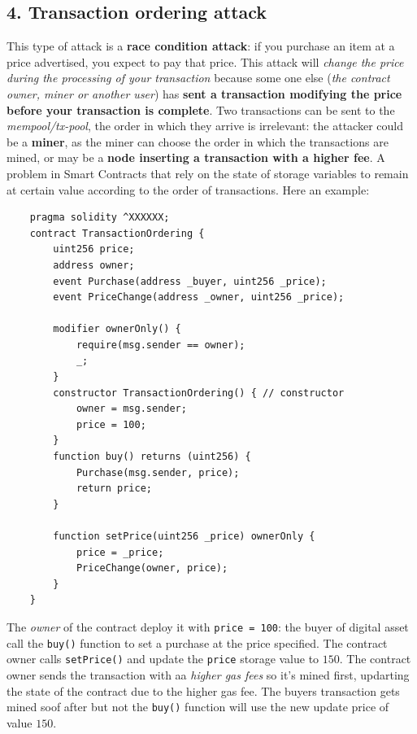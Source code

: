 \documentclass[10pt,a4paper]{report}
\begin{document}
\subsection{4. Transaction ordering attack}\label{sec:4-transaction-ordering-attack}
This type of attack is a \textbf{race condition attack}: if you purchase an item at a price advertised, you expect to pay that price.  This attack will \textit{change the price during the processing of your transaction} because some one else (\textit{the contract owner, miner or another user}) has \textbf{sent a transaction modifying the price before your transaction is complete}.
Two transactions can be sent to the \textit{mempool/tx-pool}, the order in which they arrive is irrelevant: the attacker could be a \textbf{miner}, as the miner can choose the order in which the transactions are mined, or may be a \textbf{node inserting a transaction with a higher fee}. A problem in Smart Contracts that rely on the state of storage variables to remain at certain value according to the order of transactions. Here an example:
\begin{lstlisting}
	pragma solidity ^XXXXXX; 
	contract TransactionOrdering { 
		uint256 price; 
		address owner; 
		event Purchase(address _buyer, uint256 _price); 
		event PriceChange(address _owner, uint256 _price);
		
		modifier ownerOnly() { 
			require(msg.sender == owner); 
			_; 
		} 
		constructor TransactionOrdering() { // constructor
			owner = msg.sender; 
			price = 100; 
		}
		function buy() returns (uint256) { 
			Purchase(msg.sender, price); 
			return price; 
		} 
		
		function setPrice(uint256 _price) ownerOnly { 
			price = _price; 
			PriceChange(owner, price); 
		} 
	}
\end{lstlisting}

The \textit{owner} of the contract deploy it with  \texttt{price = 100}: the buyer of digital asset call the \texttt{buy()} function to set a purchase at the price specified. The contract owner calls \texttt{setPrice()} and update the \texttt{price} storage value to $150$. The contract owner sends the transaction with aa \textit{higher gas fees} so it's mined first, updarting the state of the contract due to the higher gas fee.
The buyers transaction gets mined soof after but not the \texttt{buy()} function will use the new update price of value $150$.
\end{document}
